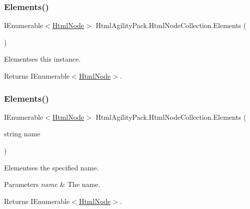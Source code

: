 \subsubsection{\texorpdfstring{Elements()}{Elements()}\hspace{0.1cm}{\footnotesize\ttfamily [1/2]}}
{\footnotesize\ttfamily I\+Enumerable$<$\hyperlink{class_html_agility_pack_1_1_html_node}{Html\+Node}$>$ Html\+Agility\+Pack.\+Html\+Node\+Collection.\+Elements (\begin{DoxyParamCaption}{ }\end{DoxyParamCaption})\hspace{0.3cm}{\ttfamily [inline]}}



Elementses this instance. 

\begin{DoxyReturn}{Returns}
I\+Enumerable$<$\hyperlink{class_html_agility_pack_1_1_html_node}{Html\+Node}$>$.
\end{DoxyReturn}
\mbox{\label{class_html_agility_pack_1_1_html_node_collection_a99c9724ed530a887ca791f1d212c2569}} 
\subsubsection{\texorpdfstring{Elements()}{Elements()}\hspace{0.1cm}{\footnotesize\ttfamily [2/2]}}
{\footnotesize\ttfamily I\+Enumerable$<$\hyperlink{class_html_agility_pack_1_1_html_node}{Html\+Node}$>$ Html\+Agility\+Pack.\+Html\+Node\+Collection.\+Elements (\begin{DoxyParamCaption}\item[{string}]{name }\end{DoxyParamCaption})\hspace{0.3cm}{\ttfamily [inline]}}



Elementses the specified name. 


\begin{DoxyParams}{Parameters}
{\em name} & The name.\\
\hline
\end{DoxyParams}
\begin{DoxyReturn}{Returns}
I\+Enumerable$<$\hyperlink{class_html_agility_pack_1_1_html_node}{Html\+Node}$>$.
\end{DoxyReturn}
\mbox{\label{class_html_agility_pack_1_1_html_node_collection_af301d90f14eac81200593013f0bc6929}} 

